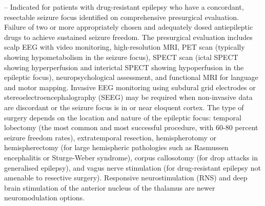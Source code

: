 -- Indicated for patients with drug-resistant epilepsy who have a concordant, resectable seizure focus identified on comprehensive presurgical evaluation. Failure of two or more appropriately chosen and adequately dosed antiepileptic drugs to achieve sustained seizure freedom. The presurgical evaluation includes scalp EEG with video monitoring, high-resolution MRI, PET scan (typically showing hypometabolism in the seizure focus), SPECT scan (ictal SPECT showing hyperperfusion and interictal SPECT showing hypoperfusion in the epileptic focus), neuropsychological assessment, and functional MRI for language and motor mapping. Invasive EEG monitoring using subdural grid electrodes or stereoelectroencephalography (SEEG) may be required when non-invasive data are discordant or the seizure focus is in or near eloquent cortex. The type of surgery depends on the location and nature of the epileptic focus: temporal lobectomy (the most common and most successful procedure, with 60-80 percent seizure freedom rates), extratemporal resection, hemispherotomy or hemispherectomy (for large hemispheric pathologies such as Rasmussen encephalitis or Sturge-Weber syndrome), corpus callosotomy (for drop attacks in generalised epilepsy), and vagus nerve stimulation (for drug-resistant epilepsy not amenable to resective surgery). Responsive neurostimulation (RNS) and deep brain stimulation of the anterior nucleus of the thalamus are newer neuromodulation options.

